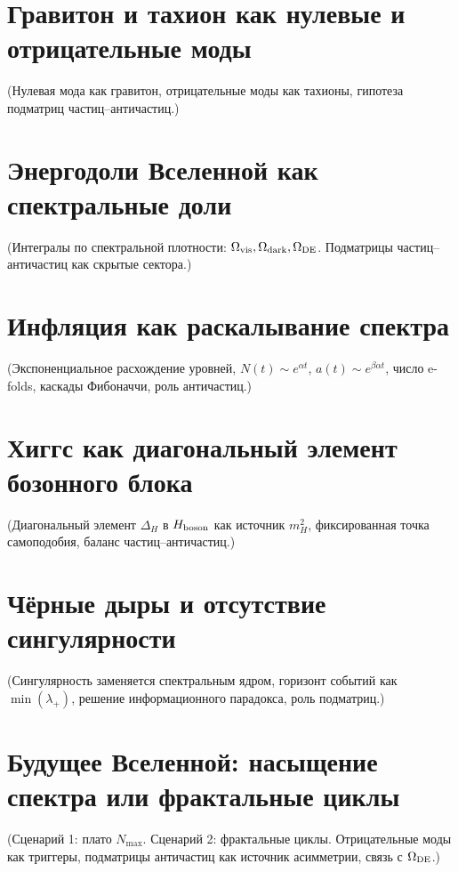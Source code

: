 \documentclass[12pt,a4paper]{article}
\begin{document}
\section{Гравитон и тахион как нулевые и отрицательные моды}
(Нулевая мода как гравитон, отрицательные моды как тахионы, гипотеза подматриц частиц–античастиц.)

\section{Энергодоли Вселенной как спектральные доли}
(Интегралы по спектральной плотности: $\Omega_{\rm vis}, \Omega_{\rm dark}, \Omega_{\rm DE}$.  
Подматрицы частиц–античастиц как скрытые сектора.)

\section{Инфляция как раскалывание спектра}
(Экспоненциальное расхождение уровней, $N(t)\sim e^{\alpha t}$, $a(t)\sim e^{\beta \alpha t}$, число e-folds, каскады Фибоначчи, роль античастиц.)

\section{Хиггс как диагональный элемент бозонного блока}
(Диагональный элемент $\Delta_H$ в $H_{\rm boson}$ как источник $m_H^2$, фиксированная точка самоподобия, баланс частиц–античастиц.)

\section{Чёрные дыры и отсутствие сингулярности}
(Сингулярность заменяется спектральным ядром, горизонт событий как $\min(\lambda_+)$, решение информационного парадокса, роль подматриц.)

\section{Будущее Вселенной: насыщение спектра или фрактальные циклы}
(Сценарий 1: плато $N_{\max}$.  
Сценарий 2: фрактальные циклы.  
Отрицательные моды как триггеры, подматрицы античастиц как источник асимметрии, связь с $\Omega_{\rm DE}$.)

\end{document}
